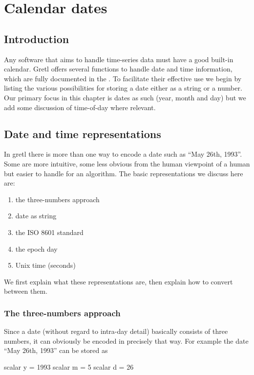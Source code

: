 \chapter{Calendar dates}
\label{chap:calendar}

\section{Introduction}
\label{sec:cal-intro}

Any software that aims to handle time-series data must have a good
built-in calendar. Gretl offers several functions to handle date and
time information, which are fully documented in the \GCR{}. To
facilitate their effective use we begin by listing the various
possibilities for storing a date either as a string or a number.
Our primary focus in this chapter is dates as such (year, month and
day) but we add some discussion of time-of-day where relevant.

\section{Date and time representations}
\label{sec:cal-representations}

In gretl there is more than one way to encode a date such as ``May
26th, 1993''. Some are more intuitive, some less obvious from the
human viewpoint of a human but easier to handle for an algorithm. The
basic representations we discuss here are:
\begin{enumerate}
\item the three-numbers approach
\item date as string
\item the ISO 8601 standard
\item the epoch day
\item Unix time (seconds)
\end{enumerate}
We first explain what these representations are, then explain how
to convert between them.

\subsection{The three-numbers approach}
\label{sec:cal-3numbers}

Since a date (without regard to intra-day detail) basically consists
of three numbers, it can obviously be encoded in precisely that way.
For example the date ``May 26th, 1993'' can be stored as
\begin{code}
  scalar y = 1993
  scalar m = 5
  scalar d = 26
\end{code}

